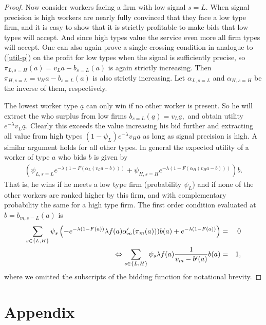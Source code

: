 \documentclass[12pt]{article}
\begin{document}
\begin{proof}
Now consider workers facing a firm with low signal $s=L.$
When signal precision is high workers are nearly fully convinced that they face a low type firm, and it is easy to show that it is strictly profitable to make bids that low types will accept. And since high types value the service even more all firm types will accept.
One can also again prove a single crossing condition in analogue to (\ref{util-p}) on the profit for low types when the signal is sufficiently precise, so $\pi _{L,s=H}(a)=v_{L}a-b_{s=L}(a)$ is again strictly increasing. Then $\pi _{H,s=L}=v_{H}a-b_{s=L}(a)$ is also strictly increasing.
Let $\alpha _{L,s=L}$ and $\alpha _{H,s=H}$ be the inverse of them, respectively.

The lowest worker type $\underline{a}$ can only win if no other worker is present.
So he will extract the who surplus from low firms $b_{s=L}(\underline{a})=v_{L}\underline{a},$ and obtain utility $e^{-\lambda }v_{L}\underline{a}.$
Clearly this exceeds the value increasing his bid further and extracting all value from high types $(1-\psi _{L})e^{-\lambda }v_{H}\underline{a}$ as long as signal precision is high.
A similar argument holds for all other types.
In general the expected utility of a worker of type $a$ who bids $b$ is given by
\begin{align*}
\left( \psi _{L,s=L}e^{-\lambda (1-F(\alpha _{L}(v_{L}a-b)))}+\psi
_{H,s=H}e^{-\lambda (1-F(\alpha _{H}(v_{H}a-b)))}\right) b.
\end{align*}
That is, he wins if he meets a low type firm (probability $\psi _{L}$) and if none of the other workers are ranked higher by this firm, and with complementary probability the same for a high type firm.
The first order condition evaluated at $b=b_{m,s=L}(a)$ is 
\begin{eqnarray*}
\sum_{s\in \{L,H\}}\psi _{s}\left( -e^{-\lambda (1-F(a))}\lambda f(a)\alpha
_{m}^{\prime }(\pi _{m}(a)))b(a)+e^{-\lambda (1-F(a))}\right)  &=&0 \\
\Leftrightarrow \sum_{s\in \{L,H\}}\psi _{s}\lambda f(a)\frac{1}{%
v_{m}-b^{\prime }(a)}b(a) &=&1,
\end{eqnarray*}%
where we omitted the subscripts of the bidding function for notational brevity.
\end{proof}


\section{Appendix}
\end{document}
